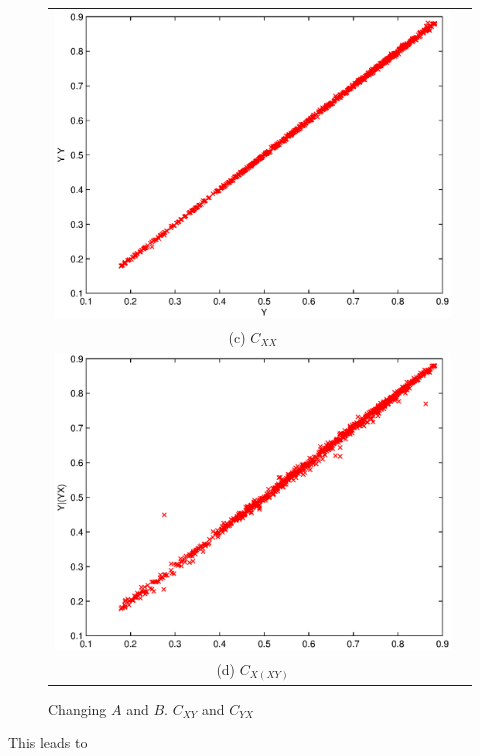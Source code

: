 \documentclass{article}
\begin{document}
\begin{center}
\begin{figure}[H]
\begin{tabular}{cc}
\includegraphics[scale=0.5]{SugFig3_YgY.eps} \\
(c) $C_{XX}$ \\[6pt]
\includegraphics[scale=0.5]{SugFig3_YgYX.eps} \\
(d) $C_{X(XY)}$ \\[6pt]
\end{tabular}
\caption{Changing $A$ and $B$.  $C_{XY}$ and $C_{YX}$}
\label{fig1}
\end{figure}
\end{center}
This leads to
\end{document}
